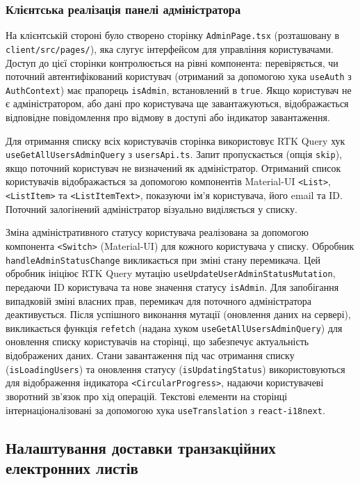 \subsubsection{Клієнтська реалізація панелі адміністратора}
На клієнтській стороні було створено сторінку \texttt{AdminPage.tsx} (розташовану в \texttt{client/src/pages/}), яка слугує інтерфейсом для управління користувачами. Доступ до цієї сторінки контролюється на рівні компонента: перевіряється, чи поточний автентифікований користувач (отриманий за допомогою хука \texttt{useAuth} з \texttt{AuthContext}) має прапорець \texttt{isAdmin}, встановлений в \texttt{true}. Якщо користувач не є адміністратором, або дані про користувача ще завантажуються, відображається відповідне повідомлення про відмову в доступі або індикатор завантаження.

Для отримання списку всіх користувачів сторінка використовує RTK Query хук \texttt{useGetAllUsersAdminQuery} з \texttt{usersApi.ts}. Запит пропускається (опція \texttt{skip}), якщо поточний користувач не визначений як адміністратор. Отриманий список користувачів відображається за допомогою компонентів Material-UI \texttt{<List>}, \texttt{<ListItem>} та \texttt{<ListItemText>}, показуючи ім'я користувача, його email та ID. Поточний залогінений адміністратор візуально виділяється у списку.

Зміна адміністративного статусу користувача реалізована за допомогою компонента \texttt{<Switch>} (Material-UI) для кожного користувача у списку. Обробник \texttt{handleAdminStatusChange} викликається при зміні стану перемикача. Цей обробник ініціює RTK Query мутацію \texttt{useUpdateUserAdminStatusMutation}, передаючи ID користувача та нове значення статусу \texttt{isAdmin}. Для запобігання випадковій зміні власних прав, перемикач для поточного адміністратора деактивується. Після успішного виконання мутації (оновлення даних на сервері), викликається функція \texttt{refetch} (надана хуком \texttt{useGetAllUsersAdminQuery}) для оновлення списку користувачів на сторінці, що забезпечує актуальність відображених даних. Стани завантаження під час отримання списку (\texttt{isLoadingUsers}) та оновлення статусу (\texttt{isUpdatingStatus}) використовуються для відображення індикатора \texttt{<CircularProgress>}, надаючи користувачеві зворотний зв'язок про хід операцій. Текстові елементи на сторінці інтернаціоналізовані за допомогою хука \texttt{useTranslation} з \texttt{react-i18next}.

\subsection{Налаштування доставки транзакційних електронних листів}
\label{subsec:email_delivery}

